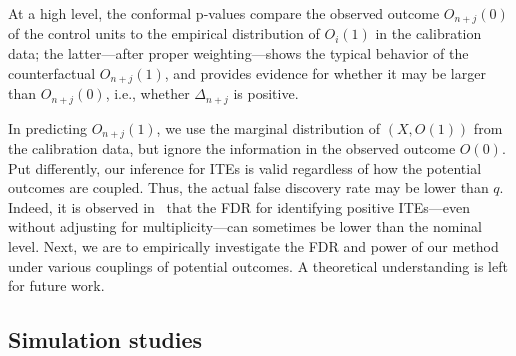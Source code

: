 At a high level, the conformal p-values
compare the observed outcome $O_{n+j}(0)$ of the control units
to the empirical distribution of $O_{i}(1)$ in the calibration data;
the latter---after proper weighting---shows the typical behavior
of the counterfactual
$O_{n+j}(1)$, and provides evidence for whether
it may be larger than $O_{n+j}(0)$, i.e., whether $\Delta_{n+j}$ is positive.

In predicting $O_{n+j}(1)$, we use the marginal distribution of $(X,O(1))$ from the calibration data, but ignore the information in the observed outcome $O(0)$.
Put differently, our
inference for ITEs is valid regardless of how
the potential outcomes are coupled.
Thus,
the actual false discovery rate may be lower than $q$.
Indeed, it is observed in~\cite{jin2023sensitivity} that the
FDR for identifying positive ITEs---even without adjusting for multiplicity---can sometimes be lower than the nominal level.
Next, we are to empirically investigate
the FDR and power of our method under various couplings of potential outcomes.
A theoretical understanding is left for future work.
%
%

\subsection{Simulation studies}


